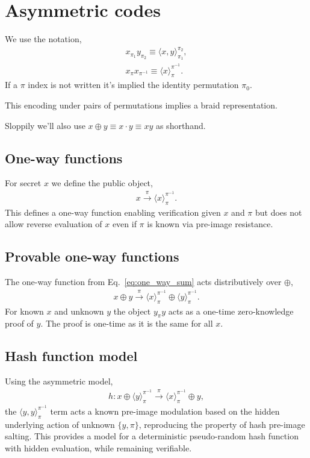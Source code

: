 \documentclass[twocolumn, aps, amsmath, amssymb, nofootinbib, superscriptaddress, longbibliography, doublefloatfix, table-of-contents, eqsecnum, rmp]{revtex4-2}
\def\braid#1#2#3#4{\langle#1,#2\rangle_{#3}^{#4}}
\def\selfbraid#1#2#3{\langle#1\rangle_{#2}^{#3}}
\begin{document}
\section{Asymmetric codes}

We use the notation,
\begin{align}
	x_{\pi_1} y_{\pi_2} \equiv \braid{x}{y}{\pi_1}{\pi_2},\nonumber\\
	x_{\pi} x_{\pi^{-1}} \equiv \selfbraid{x}{\pi}{\pi^{-1}}.
\end{align}
If a $\pi$ index is not written it's implied the identity permutation $\pi_0$.

This encoding under pairs of permutations implies a braid representation.

Sloppily we'll also use $x\oplus y \equiv x \cdot y \equiv xy$ as shorthand.

\subsection{One-way functions}

For secret $x$ we define the public object,
\begin{align} \label{eq:one_way_sum}
	x \xrightarrow{\pi} \selfbraid{x}{\pi}{\pi^{-1}}.
\end{align}
This defines a one-way function enabling verification given $x$ and $\pi$ but does not allow reverse evaluation of $x$ even if $\pi$ is known via pre-image resistance.

\subsection{Provable one-way functions}

The one-way function from Eq.~\eqref{eq:one_way_sum} acts distributively over $\oplus$,
\begin{align}
	x\oplus y \xrightarrow{\pi} \selfbraid{x}{\pi}{\pi^{-1}} \oplus \selfbraid{y}{\pi}{\pi^{-1}}.
\end{align}
For known $x$ and unknown $y$ the object $y_\pi y$ acts as a one-time zero-knowledge proof of $y$. The proof is one-time as it is the same for all $x$.

\subsection{Hash function model}

Using the asymmetric model,
\begin{align}
	h: x\oplus \selfbraid{y}{\pi}{\pi^{-1}} \xrightarrow{\pi} \selfbraid{x}{\pi}{\pi^{-1}} \oplus y,
\end{align}
the $\braid{y}{y}{\pi}{\pi^{-1}}$ term acts a known pre-image modulation based on the hidden underlying action of unknown $\{y,\pi\}$, reproducing the property of hash pre-image salting. This provides a model for a deterministic pseudo-random hash function with hidden evaluation, while remaining verifiable.
\end{document}
